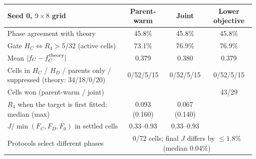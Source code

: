 \documentclass[10pt]{article}
\begin{document}
\begin{center}
\small\setlength{\tabcolsep}{5pt}
\begin{tabular}{@{}lccc@{}}
\toprule
Seed 0, $9\times8$ grid & Parent-warm & Joint & Lower objective \\
\midrule
Phase agreement with theory & 45.8\% & 45.8\% & 45.8\% \\
Gate $H_C\Leftrightarrow R_4>5/32$ (active cells) & 73.1\% & 76.9\% & 76.9\% \\
Mean $|f_C-f_C^{\rm theory}|$ & 0.379 & 0.380 & 0.379 \\
Cells in $H_C$ / $H_D$ / parents only / suppressed (theory: 34/18/0/20) & 0/52/5/15 & 0/52/5/15
 & 0/52/5/15 \\
Cells won (parent-warm / joint) & & & 43/29 \\
$R_4$ when the target is first fitted: median (max) & 0.093 (0.160) & 0.067 (0.140) & \\
$J/\min(F_C,F_D,F_0)$ in settled cells & 0.33--0.93 & 0.33--0.93 & \\
\midrule
Protocols select different phases & \multicolumn{3}{c}{0/72 cells; final $J$ differs by
$\le1.8\%$ (median 0.04\%)} \\
\bottomrule
\end{tabular}
\end{center}
\end{document}
